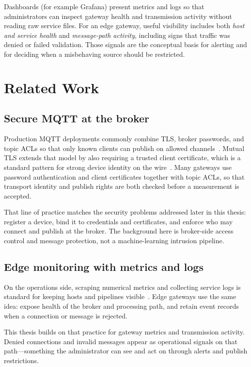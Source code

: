 \documentclass[12pt,a4paper]{report}
\begin{document}
Dashboards (for example Grafana) present metrics and
logs so that administrators can inspect gateway health
and transmission activity without reading raw service
files. For an edge gateway, useful visibility includes
both \emph{host and service health} and \emph{message-path
activity}, including signs that traffic was denied or
failed validation. Those signals are the conceptual
basis for alerting and for deciding when a misbehaving
source should be restricted.

\section{Related Work}

\subsection{Secure MQTT at the broker}

Production MQTT deployments commonly combine TLS,
broker passwords, and topic ACLs so that only known
clients can publish on allowed
channels~\cite{mqtt,mqttsurvey}. Mutual TLS extends
that model by also requiring a trusted client
certificate, which is a standard pattern for strong
device identity on the wire~\cite{tls,x509}. Many
gateways use password authentication and client
certificates together with topic ACLs, so that
transport identity and publish rights are both
checked before a measurement is accepted.

That line of practice matches the security problems
addressed later in this thesis: register a device,
bind it to credentials and certificates, and enforce
who may connect and publish at the broker. The
background here is broker-side access control and
message protection, not a machine-learning intrusion
pipeline.

\subsection{Edge monitoring with metrics and logs}

On the operations side, scraping numerical metrics and
collecting service logs is standard for keeping hosts
and pipelines visible~\cite{sre,loganalysis}. Edge
gateways use the same idea: expose health of the
broker and processing path, and retain event records
when a connection or message is rejected.

This thesis builds on that practice for gateway
metrics and transmission activity. Denied connections
and invalid messages appear as operational signals on
that path---something the administrator can see and
act on through alerts and publish restrictions.
\end{document}
